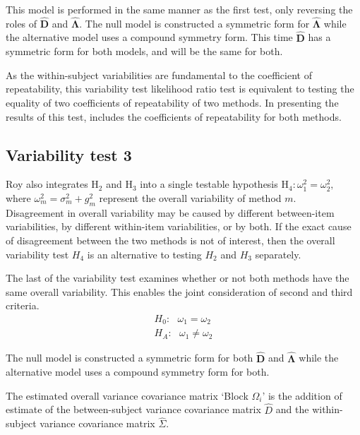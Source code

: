\documentclass[12pt, a4paper]{report}
\theoremstyle{plain}
\theoremstyle{definition}
\theoremstyle{remark}
\begin{document}
	This model is performed in the same manner as the first test, only reversing the roles of $\boldsymbol{\hat{D}}$ and $\boldsymbol{\hat{\Lambda}}$. The null model is constructed a symmetric form for $\boldsymbol{\hat{\Lambda}}$ while the alternative model uses a compound symmetry form. This time $\boldsymbol{\hat{D}}$ has a symmetric form for both models, and will be the same for both.
	
	As the within-subject variabilities are fundamental to the coefficient of repeatability, this variability test likelihood ratio test is equivalent to testing the equality of two coefficients of repeatability of two methods. In presenting the results of this test, \citet{ARoy2009} includes the coefficients of repeatability for both methods.
	
	
	\subsection{Variability test 3}
	
	Roy also integrates $\mathrm{H}_2$ and $\mathrm{H}_3$ into a single testable hypothesis $\mathrm{H}_4\colon \omega^2_1=\omega^2_2,$ where $\omega^2_m = \sigma^2_m + g^2_m$ represent the overall variability of method $m.$ \\
	\bigskip
	Disagreement in overall variability may be caused by different between-item variabilities, by different within-item variabilities, or by both.  If the exact cause of disagreement between the two methods is not of interest, then the overall variability test $H_4$ is an alternative to testing $H_2$ and $H_3$ separately.
	
	
	
	The last of the variability test examines whether or not both methods have the same overall variability. This enables the joint consideration of second and third criteria.
	\begin{eqnarray*}
		H_{0}: \mbox{ }\omega_{1}  = \omega_{2} \\
		H_{A}: \mbox{ }\omega_{1}  \neq \omega_{2}
	\end{eqnarray*}
	
	The null model is constructed a symmetric form for both $\boldsymbol{\hat{D}}$ and $\boldsymbol{\hat{\Lambda}}$ while the alternative model uses a compound symmetry form for both.
	
	
	The estimated overall variance covariance matrix `Block
	$\Omega_{i}$' is the addition of estimate of the between-subject variance covariance matrix $\hat{D}$ and the within-subject variance covariance matrix $\hat{\Sigma}$.
	
\end{document}
